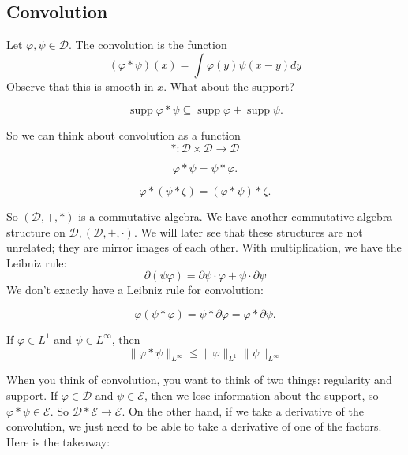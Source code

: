 \subsection{Convolution}
\begin{definition}
    [Convolution] Let $\varphi, \psi \in \mathcal{D} .$ The convolution is the function
    $$
    (\varphi * \psi)(x)=\int \varphi(y) \psi(x-y) d y
    $$
    Observe that this is smooth in $x .$ What about the support?
\end{definition}

\begin{proposition}
\[
    \operatorname{supp} \varphi * \psi \subseteq \operatorname{supp} \varphi+\operatorname{supp} \psi.
\]
\end{proposition}

So we can think about convolution as a function
$$
*: \mathcal{D} \times \mathcal{D} \rightarrow \mathcal{D}
$$

\begin{proposition}
    \[
        \varphi * \psi=\psi * \varphi.
    \]
\end{proposition}

\begin{proposition}
    \[
        \varphi *(\psi * \zeta)=(\varphi * \psi) * \zeta.
    \]
\end{proposition}
So $(\mathcal{D},+, *)$ is a commutative algebra. We have another commutative algebra structure on $\mathcal{D},(\mathcal{D},+, \cdot)$. We will later see that these structures are not unrelated; they are mirror images of each other.
With multiplication, we have the Leibniz rule:
$$
\partial(\psi \varphi)=\partial \psi \cdot \varphi+\psi \cdot \partial \psi
$$
We don't exactly have a Leibniz rule for convolution:
\begin{proposition}
    \[
        \varphi(\psi * \varphi)=\psi * \partial \varphi=\varphi * \partial \psi.
    \]
\end{proposition}

\begin{proposition}
    If $\varphi \in L^{1}$ and $\psi \in L^{\infty}$, then
$$
\|\varphi * \psi\|_{L^{\infty}} \leq\|\varphi\|_{L^{1}}\|\psi\|_{L^{\infty}}
$$
\end{proposition}

When you think of convolution, you want to think of two things: regularity and support. If $\varphi \in \mathcal{D}$ and $\psi \in \mathcal{E}$, then we lose information about the support, so $\varphi * \psi \in \mathcal{E}$. So $\mathcal{D} * \mathcal{E} \rightarrow \mathcal{E}$. On the other hand, if we take a derivative of the convolution, we just need to be able to take a derivative of one of the factors. Here is the takeaway:

